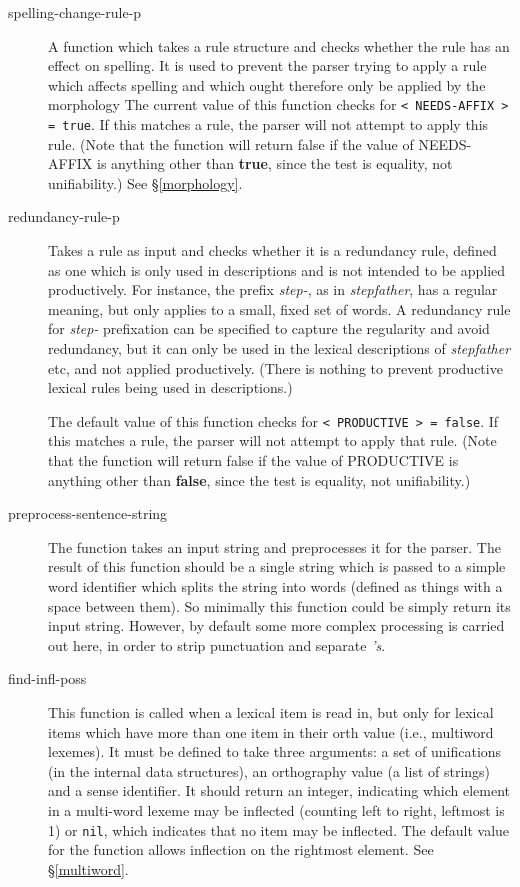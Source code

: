 \documentclass[12pt]{report}
\begin{document}
\begin{description}
\item [spelling-change-rule-p] 
A function which takes a rule structure and checks whether the rule has an
effect on spelling. It
is used to prevent the parser 
trying to apply a rule which affects spelling and
which ought therefore only be applied by the morphology
The current value of this
function checks for \verb+< NEEDS-AFFIX > = true+.
If this matches a rule, the parser will not attempt to apply this rule.
(Note that the function will return false if the value of
NEEDS-AFFIX is anything other than {\bf true}, since the
test is equality, not unifiability.)
See \S\ref{morphology}.
\item [redundancy-rule-p]  Takes a rule as input and checks whether
it is a redundancy rule, defined as one which is only used in
descriptions and is not intended to be applied productively.
For instance, the prefix {\it step-}, as in {\it stepfather}, 
has a regular meaning, but only applies to a small, fixed set of words.
A redundancy rule for {\it step-} prefixation can be specified to capture the
regularity and avoid redundancy, but it can only be used in the
lexical descriptions of {\it stepfather} etc, and not applied productively.
(There is nothing to prevent productive lexical rules being used in
descriptions.)

The default value of this function checks for \verb+< PRODUCTIVE > = false+.
If this matches a rule, the parser will not attempt to apply that rule.
(Note that the function will return false if the value of
PRODUCTIVE is anything other than {\bf false}, since the
test is equality, not unifiability.)

\item[preprocess-sentence-string]  The function
takes an input string and preprocesses it for the parser.  
The result of this function should be a single string which
is passed to a simple word identifier
which splits the string into words (defined as things
with a space between them).
So minimally this function could be simply return its input string.
However, by default some more complex processing is carried
out here, in order to
strip punctuation and separate {\it 's}.

\item[find-infl-poss] This function is called when a lexical
item is read in, but only for lexical items which have more than one
item in their orth value (i.e., multiword lexemes).  
It
must be defined to take three arguments: a set of unifications
(in the internal data structures), an orthography value (a list of strings)
and a sense identifier.  It should return an integer, indicating 
which element in a multi-word lexeme may be inflected
(counting left to right, leftmost is 1) or {\tt nil},
which indicates that no item may be inflected.
The default value for the function allows inflection on the rightmost element.
See \S\ref{multiword}.


\end{description}
\end{document}
